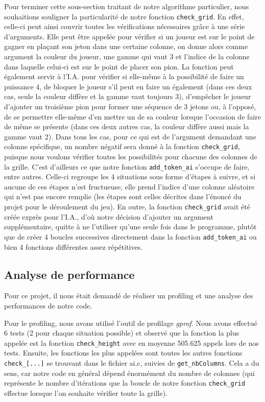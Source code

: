 \documentclass[a4paper, 11pt, oneside]{article}
\begin{document}
Pour terminer cette sous-section traitant de notre algorithme particulier, nous souhaitions souligner la particularité de notre fonction \texttt{check\_grid}. En effet, celle-ci peut ainsi couvrir toutes les vérifications nécessaires grâce à une série d'arguments. Elle peut être appelée pour vérifier si un joueur est sur le point de gagner en plaçant son jeton dans une certaine colonne, on donne alors comme argument la couleur du joueur, une gamme qui vaut 3 et l'indice de la colonne dans laquelle celui-ci est sur le point de placer son pion. La fonction peut également servir à l'I.A. pour vérifier si elle-même à la possibilité de faire un puissance 4, de bloquer le joueur s'il peut en faire un également (dans ces deux cas, seule la couleur diffère et la gamme vaut toujours 3), d'empêcher le joueur d'ajouter un troisième pion pour former une séquence de 3 jetons ou, à l'opposé, de se permettre elle-même d'en mettre un de sa couleur lorsque l'occasion de faire de même se présente (dans ces deux autres cas, la couleur diffère aussi mais la gamme vaut 2). Dans tous les cas, pour ce qui est de l'argument demandant une colonne spécifique, un nombre négatif sera donné à la fonction \texttt{check\_grid}, puisque nous voulons vérifier toutes les possibilités pour chacune des colonnes de la grille. C'est d'ailleurs ce que notre fonction \texttt{add\_token\_ai} s'occupe de faire, entre autres. Celle-ci regroupe les 4 situations sous forme d'étapes à suivre, et si aucune de ces étapes n'est fructueuse, elle prend l'indice d'une colonne aléatoire qui n'est pas encore remplie (les étapes sont celles décrites dans l'énoncé du projet pour le déroulement du jeu). En outre, la fonction \texttt{check\_grid} avait été créée exprès pour l'I.A., d'où notre décision d'ajouter un argument supplémentaire, quitte à ne l'utiliser qu'une seule fois dans le programme, plutôt que de créer 4 boucles successives directement dans la fonction \texttt{add\_token\_ai} ou bien 4 fonctions différentes assez répétitives.

\subsection{Analyse de performance}
Pour ce projet, il nous était demandé de réaliser un profiling et une analyse des performances de notre code. 

Pour le profiling, nous avons utilisé l'outil de profilage \emph{gprof}. Nous avons effectué 6 tests (2 pour chaque situation possible) et observé que la fonction la plus appelée est la fonction \texttt{check\_height} avec en moyenne 505.625 appels lors de nos tests. Ensuite, les fonctions les plus appelées sont toutes les autres fonctions \texttt{check\_[...]} se trouvant dans le fichier ai.c, suivies de \texttt{get\_nbColumns}. Cela a du sens, car notre code en général dépend énormément du nombre de colonnes (qui représente le nombre d'itérations que la boucle de notre fonction \texttt{check\_grid} effectue lorsque l'on souhaite vérifier toute la grille).
\end{document}
